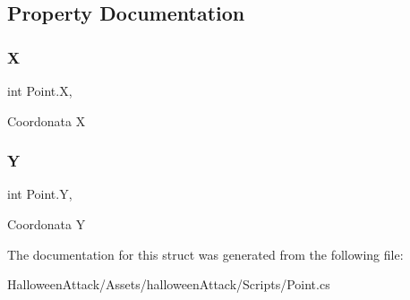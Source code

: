 \subsection{Property Documentation}
\mbox{\label{struct_point_a944eb35c3d0b0efea5555a82a8c4a6fc}} 
\subsubsection{\texorpdfstring{X}{X}}
{\footnotesize\ttfamily int Point.\+X\hspace{0.3cm}{\ttfamily [get]}, {\ttfamily [set]}}

Coordonata X \mbox{\label{struct_point_ac41b750e0b7eb2adbe2c808e4521a94b}} 
\subsubsection{\texorpdfstring{Y}{Y}}
{\footnotesize\ttfamily int Point.\+Y\hspace{0.3cm}{\ttfamily [get]}, {\ttfamily [set]}}

Coordonata Y 

The documentation for this struct was generated from the following file\+:\begin{DoxyCompactItemize}
\item 
Halloween\+Attack/\+Assets/halloween\+Attack/\+Scripts/Point.\+cs\end{DoxyCompactItemize}
